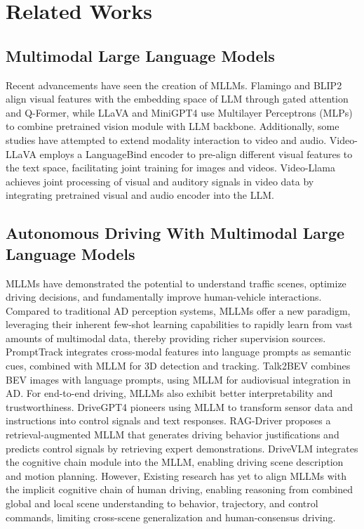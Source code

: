 \section{Related Works}
\label{submission}

\subsection{Multimodal Large Language Models}

Recent advancements have seen the creation of MLLMs. Flamingo \cite{alayrac2022flamingo} and BLIP2 \cite{li2023blip} align visual features with the embedding space of LLM through gated attention and Q-Former, while LLaVA \cite{liu2024improved} and MiniGPT4 \cite{zhu2023minigpt} use Multilayer Perceptrons (MLPs) to combine pretrained vision module with LLM backbone. Additionally, some studies have attempted to extend modality interaction to video and audio. Video-LLaVA \cite{lin2023video} employs a LanguageBind encoder to pre-align different visual features to the text space, facilitating joint training for images and videos. Video-Llama \cite{zhang2023video} achieves joint processing of visual and auditory signals in video data by integrating pretrained visual and audio encoder into the LLM.

\subsection{Autonomous Driving With Multimodal Large Language Models}

MLLMs have demonstrated the potential to understand traffic scenes, optimize driving decisions, and fundamentally improve human-vehicle interactions. Compared to traditional AD perception systems, MLLMs offer a new paradigm, leveraging their inherent few-shot learning capabilities to rapidly learn from vast amounts of multimodal data, thereby providing richer supervision sources. PromptTrack \cite{wu2023language} integrates cross-modal features into language prompts as semantic cues, combined with MLLM for 3D detection and tracking.  Talk2BEV \cite{choudhary2023talk2bev} combines BEV images with language prompts, using MLLM for audiovisual integration in AD. For end-to-end driving, MLLMs also exhibit better interpretability and trustworthiness. DriveGPT4 \cite{xu2024drivegpt4} pioneers using MLLM to transform sensor data and instructions into control signals and text responses. RAG-Driver \cite{yuan2024rag} proposes a retrieval-augmented MLLM that generates driving behavior justifications and predicts control signals by retrieving expert demonstrations. DriveVLM \cite{tian2024drivevlm} integrates the cognitive chain module into the MLLM, enabling driving scene description and motion planning. However, Existing research has yet to align MLLMs with the implicit cognitive chain of human driving, enabling reasoning from combined global and local scene understanding to behavior, trajectory, and control commands, limiting cross-scene generalization and human-consensus driving.

